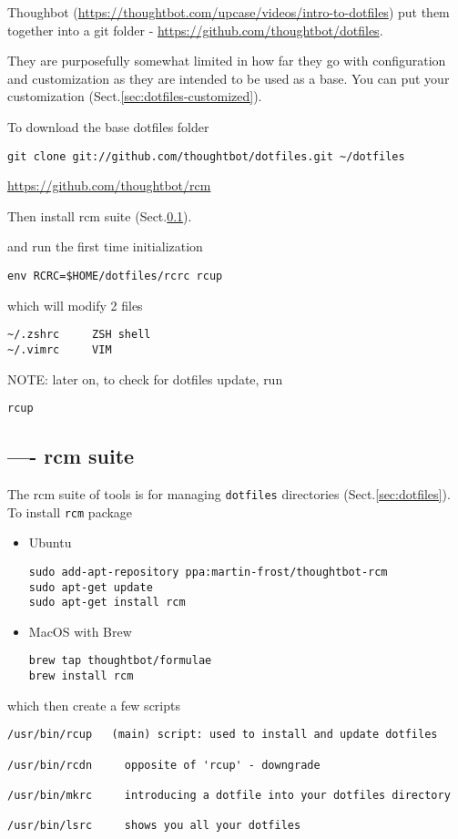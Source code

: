 Thoughbot
(\url{https://thoughtbot.com/upcase/videos/intro-to-dotfiles})
put them together into a git folder -
\url{https://github.com/thoughtbot/dotfiles}.

They are purposefully somewhat limited in how far they go with configuration and
customization as they are intended to be used as a base. You can put your
customization (Sect.\ref{sec:dotfiles-customized}).

To download the base dotfiles folder
\begin{verbatim}
git clone git://github.com/thoughtbot/dotfiles.git ~/dotfiles
\end{verbatim}
\url{https://github.com/thoughtbot/rcm}

Then install rcm suite (Sect.\ref{sec:rcm-suite}).


and run the first time initialization
\begin{verbatim}
env RCRC=$HOME/dotfiles/rcrc rcup
\end{verbatim}
which will modify 2 files
\begin{verbatim}
~/.zshrc     ZSH shell
~/.vimrc     VIM
\end{verbatim}

NOTE: later on, to check for dotfiles update, run
\begin{verbatim}
rcup
\end{verbatim}

\subsection{---- rcm suite}
\label{sec:rcm-suite}

The rcm suite of tools is for managing \verb!dotfiles! directories
(Sect.\ref{sec:dotfiles}). To install \verb!rcm! package
\begin{itemize}
  \item Ubuntu

\begin{verbatim}
sudo add-apt-repository ppa:martin-frost/thoughtbot-rcm
sudo apt-get update
sudo apt-get install rcm
\end{verbatim}
  
  \item MacOS with Brew

\begin{verbatim}
brew tap thoughtbot/formulae
brew install rcm
\end{verbatim}
\end{itemize}
which then create a few scripts
\begin{verbatim}
/usr/bin/rcup   (main) script: used to install and update dotfiles

/usr/bin/rcdn     opposite of 'rcup' - downgrade 

/usr/bin/mkrc     introducing a dotfile into your dotfiles directory

/usr/bin/lsrc     shows you all your dotfiles 
\end{verbatim}

